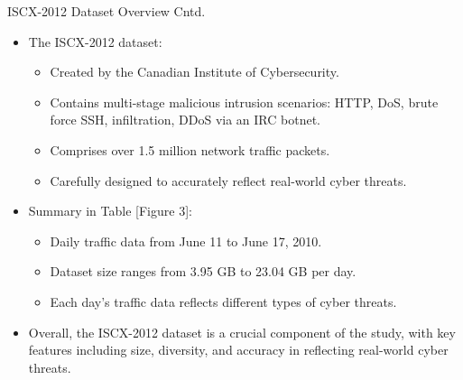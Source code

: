 \documentclass{beamer}
\begin{document}
\begin{frame}{ISCX-2012 Dataset Overview Cntd.}


  \begin{itemize}
    \item The ISCX-2012 dataset:
      \begin{itemize}
        \item Created by the Canadian Institute of Cybersecurity.
        \item Contains multi-stage malicious intrusion scenarios: HTTP, DoS, brute force SSH, infiltration, DDoS via an IRC botnet.
        \item Comprises over 1.5 million network traffic packets.
        \item Carefully designed to accurately reflect real-world cyber threats.
      \end{itemize}
    \item Summary in Table [Figure 3]:
      \begin{itemize}
        \item Daily traffic data from June 11 to June 17, 2010.
        \item Dataset size ranges from 3.95 GB to 23.04 GB per day.
        \item Each day's traffic data reflects different types of cyber threats.
      \end{itemize}
    \item Overall, the ISCX-2012 dataset is a crucial component of the study, with key features including size, diversity, and accuracy in reflecting real-world cyber threats.
  \end{itemize}
\end{frame}
\end{document}
